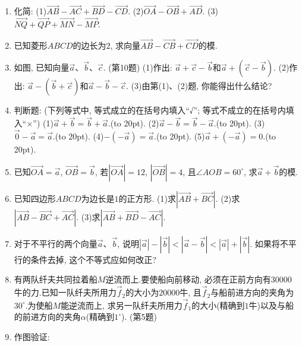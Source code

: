 \documentclass[10pt,a4paper]{article}
\newcommand{\bracket}[1]{(\hbox to #1pt{})}
\begin{document}
\begin{enumerate}[1.]
\item 化简:
(1)$\overrightarrow{AB}-\overrightarrow{AC}+\overrightarrow{BD}-\overrightarrow{CD}$. (2)$\overrightarrow{OA}-\overrightarrow{OB}+\overrightarrow{AD}$.
(3)$\overrightarrow{NQ}+\overrightarrow{QP}+\overrightarrow{MN}-\overrightarrow{MP}$.
\item 已知菱形$ABCD$的边长为$2$, 求向量$\overrightarrow{AB}-\overrightarrow{CB}+\overrightarrow{CD}$的模.
\item 如图, 已知向量$\overrightarrow a$、$\overrightarrow b$、$\overrightarrow c$.
(第10题)
(1)作出: $\overrightarrow a+\overrightarrow c-\overrightarrow b$和$\overrightarrow a+(\overrightarrow c-\overrightarrow b)$. (2)作出: $\overrightarrow a-(\overrightarrow b+\overrightarrow c)$和$\overrightarrow a-\overrightarrow b-\overrightarrow c$.
(3)由第(1)、(2)题, 你能得出什么结论?
\item 判断题: (下列等式中, 等式成立的在括号内填入``√''; 等式不成立的在括号内填入``×'')
(1)$\overrightarrow a+\overrightarrow b=\overrightarrow b+\overrightarrow a$.\bracket{20}.
(2)$\overrightarrow a-\overrightarrow b=\overrightarrow b-\overrightarrow a$.\bracket{20}.
(3)$\overrightarrow 0-\overrightarrow a=\overrightarrow a$.\bracket{20}.
(4)$-(-\overrightarrow a)=\overrightarrow a$.\bracket{20}.
(5)$\overrightarrow a+(-\overrightarrow a)=0$.\bracket{20}.
\item 已知$\overrightarrow{OA}=\overrightarrow a$, $\overrightarrow{OB}=\overrightarrow b$, 若$|\overrightarrow{OA}|=12$, $|\overrightarrow{OB}|=4$, 且$\angle AOB=60^{\circ }$, 求$\overrightarrow a+\overrightarrow b$的模.
\item 已知四边形$ABCD$为边长是$1$的正方形.
(1)求$|\overrightarrow{AB}+\overrightarrow{BC}|$. (2)求$|\overrightarrow{AB}-\overrightarrow{BC}+\overrightarrow{AC}|$.
(3)求$|\overrightarrow{AB}+\overrightarrow{BD}-\overrightarrow{AC}|$.
\item 对于不平行的两个向量$\overrightarrow a$、$\overrightarrow b$, 说明$|\overrightarrow a|-|\overrightarrow b|<|\overrightarrow a-\overrightarrow b|<|\overrightarrow a|+|\overrightarrow b|$.
如果将不平行的条件去掉, 这个不等式应如何改正?
\item 有两队纤夫共同拉着船$M$逆流而上.要使船向前移动, 必须在正前方向有$30000$牛的力.已知一队纤夫所用力$\overrightarrow f_2$的大小为$20000$牛, 且$\overrightarrow f_2$与船前进方向的夹角为$30^{\circ }$.为使船$M$能逆流而上, 求另一队纤夫所用力$\overrightarrow f_1$的大小(精确到$1$牛)以及与船的前进方向的夹角$\alpha$(精确到$1^{\circ }$).
(第5题)
\item 作图验证:

\end{enumerate}
\end{document}
